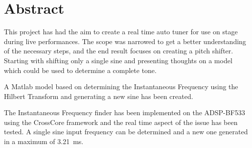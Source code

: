 
\chapter{Abstract}
\label{sec:Abstract}
This project has had the aim to create a real time auto tuner for use on stage during live performances.
The scope was narrowed to get a better understanding of the necessary steps, and the end result focuses on creating a pitch shifter.
Starting with shifting only a single sine and presenting thoughts on a model which could be used to determine a complete tone.

A Matlab model based on determining the Instantaneous Frequency using the Hilbert Transform and generating a new sine has been created.

The Instantaneous Frequency finder has been implemented on the ADSP-BF533 using the CrossCore framework and the real time aspect of the issue has been tested.
A single sine input frequency can be determined and a new one generated in a maximum of \SI{3.21}{\milli\second}.